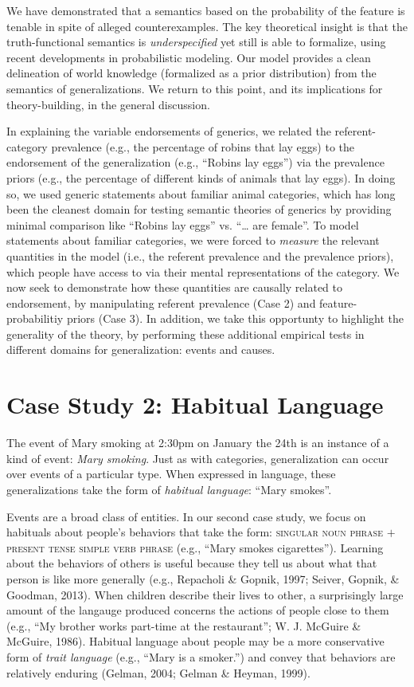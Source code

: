\documentclass[english,floatsintext,man]{apa6}
\theoremstyle{definition}
\theoremstyle{definition}
\theoremstyle{definition}
\theoremstyle{remark}
\begin{document}
We have demonstrated that a semantics based on the probability of the
feature is tenable in spite of alleged counterexamples. The key
theoretical insight is that the truth-functional semantics is
\emph{underspecified} yet still is able to formalize, using recent
developments in probabilistic modeling. Our model provides a clean
delineation of world knowledge (formalized as a prior distribution) from
the semantics of generalizations. We return to this point, and its
implications for theory-building, in the general discussion.

In explaining the variable endorsements of generics, we related the
referent-category prevalence (e.g., the percentage of robins that lay
eggs) to the endorsement of the generalization (e.g., \enquote{Robins
lay eggs}) via the prevalence priors (e.g., the percentage of different
kinds of animals that lay eggs). In doing so, we used generic statements
about familiar animal categories, which has long been the cleanest
domain for testing semantic theories of generics by providing minimal
comparison like \enquote{Robins lay eggs} vs. \enquote{\ldots{} are
female}. To model statements about familiar categories, we were forced
to \emph{measure} the relevant quantities in the model (i.e., the
referent prevalence and the prevalence priors), which people have access
to via their mental representations of the category. We now seek to
demonstrate how these quantities are causally related to endorsement, by
manipulating referent prevalence (Case 2) and feature-probabilitiy
priors (Case 3). In addition, we take this opportunty to highlight the
generality of the theory, by performing these additional empirical tests
in different domains for generalization: events and causes.

\section{Case Study 2: Habitual
Language}\label{case-study-2-habitual-language}

The event of Mary smoking at 2:30pm on January the 24th is an instance
of a kind of event: \emph{Mary smoking}. Just as with categories,
generalization can occur over events of a particular type. When
expressed in language, these generalizations take the form of
\emph{habitual language}: \enquote{Mary smokes}.

Events are a broad class of entities. In our second case study, we focus
on habituals about people's behaviors that take the form:
\textsc{singular noun phrase} \(+\)
\textsc{present tense simple verb phrase} (e.g., \enquote{Mary smokes
cigarettes}). Learning about the behaviors of others is useful because
they tell us about what that person is like more generally (e.g.,
Repacholi \& Gopnik, 1997; Seiver, Gopnik, \& Goodman, 2013). When
children describe their lives to other, a surprisingly large amount of
the langauge produced concerns the actions of people close to them
(e.g., ``My brother works part-time at the restaurant''; W. J. McGuire
\& McGuire, 1986). Habitual language about people may be a more
conservative form of \emph{trait language} (e.g., \enquote{Mary is a
smoker.}) and convey that behaviors are relatively enduring (Gelman,
2004; Gelman \& Heyman, 1999).
\end{document}
